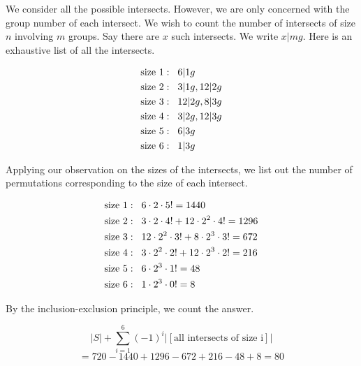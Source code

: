 \documentclass{article}
\newcommand{\m}{
    \cdot
}
\begin{document}
We consider all the possible intersects. 
However, we are only concerned with the group number 
of each intersect. 
We wish to count the number of intersects of size $n$
involving $m$ groups. Say there are $x$ such intersects. 
We write $x|mg$. Here is an exhaustive list of 
all the intersects. 
\newcommand{\size}[1]{
    {
        \textrm{size }{#1}:
        \hspace{3mm}
    }
}

\begin{align*}
    &\size1 6|1g\\
&\size 2 3|1g, 12|2g\\
&\size3 12|2g, 8|3g\\
&\size4 3|2g, 12|3g\\
&\size5 6|3g\\
&\size6 1|3g
\end{align*}

Applying our observation on the sizes of the intersects, 
we list out the number of permutations corresponding 
to the size of each intersect. 

\begin{align*}
    &\size1 6\m2\m5! = 1440\\
&\size2 3\m2\m4! + 12\m2^2\m4! = 1296  \\
&\size3 12\m2^2\m3!+ 8\m2^3\m3! = 672\\
&\size4 3\m2^2\m2!+ 12\m2^3\m2! = 216\\
&\size5 6\m2^3\m1! = 48\\
&\size6 1\m2^3\m0! = 8
\end{align*}

By the inclusion-exclusion principle, we count the answer. 

\[
    |S| + \sum_{i = 1}^{6} (-1)^i|[
        \textrm{all intersects of size i}
    ]|
\]
\[
    = 720 - 1440 + 1296-672+216 -48 + 8
    = \boxed{80}
\]
\end{document}
